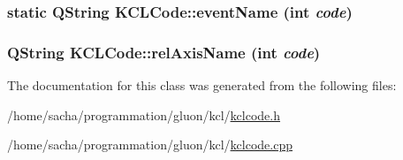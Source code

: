 \hypertarget{class_k_c_l_code_220faab8799839c0990bfab94921fef0}{
\subsubsection[{eventName}]{\setlength{\rightskip}{0pt plus 5cm}static QString KCLCode::eventName (int {\em code})}}
\label{class_k_c_l_code_220faab8799839c0990bfab94921fef0}


\hypertarget{class_k_c_l_code_e9c9091ff36d6a0340170882e189177e}{
\subsubsection[{relAxisName}]{\setlength{\rightskip}{0pt plus 5cm}QString KCLCode::relAxisName (int {\em code})}}
\label{class_k_c_l_code_e9c9091ff36d6a0340170882e189177e}




The documentation for this class was generated from the following files:\begin{CompactItemize}
\item 
/home/sacha/programmation/gluon/kcl/\hyperlink{kclcode_8h}{kclcode.h}\item 
/home/sacha/programmation/gluon/kcl/\hyperlink{kclcode_8cpp}{kclcode.cpp}\end{CompactItemize}
